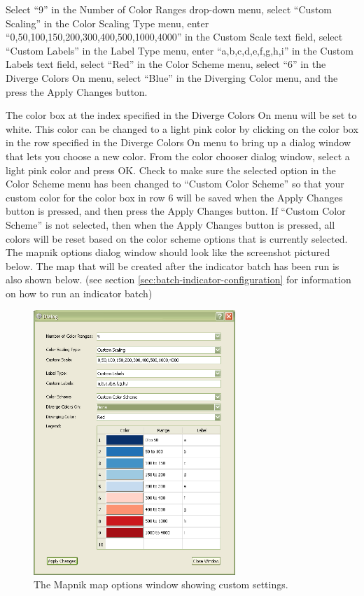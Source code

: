 Select ``9'' in the Number of Color Ranges drop-down menu, select 
``Custom Scaling'' in the Color Scaling Type menu, enter 
``0,50,100,150,200,300,400,500,1000,4000'' in the Custom Scale text field, 
select ``Custom Labels'' in the Label Type menu, enter ``a,b,c,d,e,f,g,h,i'' 
in the Custom Labels text field, select ``Red'' in the Color Scheme menu, 
select ``6'' in the Diverge Colors On menu, select ``Blue'' in the Diverging 
Color menu, and the press the Apply Changes button.

The color box at the index specified in the Diverge Colors On menu 
will be set to white. This color can be changed to a light pink 
color by clicking on the color box in the row specified in 
the Diverge Colors On menu to bring up a dialog window that lets 
you choose a new color. From the color chooser dialog window, select 
a light pink color and press OK.  Check to make sure the selected option in the 
Color Scheme menu has been changed to ``Custom Color Scheme'' so that your custom color 
for the color box in row 6 will be saved when the Apply Changes button 
is pressed, and then press the Apply Changes button. If 
``Custom Color Scheme'' is not selected, then when the Apply Changes 
button is pressed, all colors will be reset based on the color scheme
options that is currently selected. The mapnik 
options dialog window should look like the screenshot pictured below. 
The map that will be created after the indicator batch has been run 
is also shown below. (see section \ref{sec:batch-indicator-configuration} 
for information on how to run an indicator batch)

\begin{figure}[hb]
\begin{center}
\includegraphics[width=3in]{part-gui/images/result-manager-custom-mapnik-settings.png}
\end{center}
\caption{The Mapnik map options window showing custom settings.}
\label{fig:result-manager-custom-mapnik-settings}
\end{figure}
\clearpage

